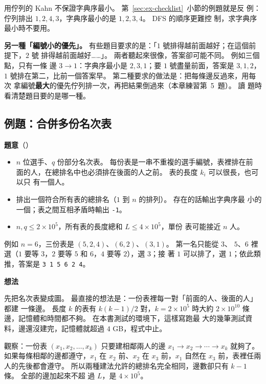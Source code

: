 用佇列的 Kahn 不保證字典序最小。 第~\ref{sec:ex-checklist}~小節的例題就是反
例：佇列排出 $1, 2, 4, 3$，字典序最小的是 $1, 2, 3, 4$。 DFS 的順序更難控
制，求字典序最小時不要用。

\textbf{另一種「編號小的優先」。} 有些題目要求的是：「$1$ 號排得越前面越好；在這個前提下，$2$ 號
排得越前面越好……」。 兩者聽起來很像，答案卻可能不同。 例如三個點，只有一條
邊 $3 \to 1$：字典序最小是 $2, 3, 1$；要 $1$ 號盡量前面，答案是 $3, 1, 2$，
$1$ 號排在第二，比前一個答案早。 第二種要求的做法是：把每條邊反過來，用每次
拿編號\textbf{最大}的優先佇列排一次，再把結果倒過來（本章練習第~5~題）。 讀
題時看清楚題目要的是哪一種。

\subsection{例題：合併多份名次表}
\label{sec:ex-rankings}

\textbf{題意}（）

\begin{itemize}
\item $n$ 位選手、$q$ 份部分名次表。 每份表是一串不重複的選手編號，表裡排在前
面的人，在總排名中也必須排在後面的人之前。 表的長度 $k_i$ 可以很長，也可以只
有一個人。
\item 排出一個符合所有表的總排名（$1$ 到 $n$ 的排列）。 存在的話輸出字典序最
小的一個；表之間互相矛盾時輸出 \texttt{-1}。
\item $n, q \le 2 \times 10^5$，所有表的長度總和 $L \le 4 \times 10^5$，單份
表可能接近 $n$ 人。
\end{itemize}

例如 $n = 6$，三份表是 $(5, 2, 4)$、$(6, 2)$、$(3, 1)$。 第一名只能從 $3$、
$5$、$6$ 裡選（$1$ 要等 $3$，$2$ 要等 $5$ 和 $6$，$4$ 要等 $2$），選 $3$；接
著 $1$ 可以排了，選 $1$；依此類推，答案是 \texttt{3 1 5 6 2 4}。

\textbf{想法}

先把名次表變成圖。 最直接的想法是：一份表裡每一對「前面的人、後面的人」都建
一條邊。 長度 $k$ 的表有 $k(k - 1)/2$ 對，$k = 2 \times 10^5$ 時大約
$2 \times 10^{10}$ 條邊，記憶體和時間都不夠。 在本書測試的環境下，這樣寫跑最
大的幾筆測試資料，邊還沒建完，記憶體就超過 $4$ GB，程式中止。

觀察：一份表 $(x_1, x_2, \ldots, x_k)$ 只要建相鄰兩人的邊
$x_1 \to x_2 \to \cdots \to x_k$ 就夠了。 如果每條相鄰的邊都遵守，$x_1$ 在
$x_2$ 前、$x_2$ 在 $x_3$ 前，$x_1$ 自然在 $x_3$ 前，表裡任兩人的先後都會遵守。
所以兩種建法允許的總排名完全相同，邊數卻只有 $k - 1$ 條。 全部的邊加起來不超
過 $L$，是 $4 \times 10^5$。

